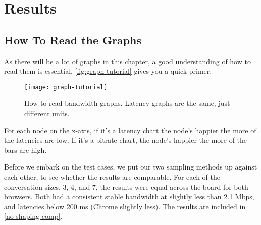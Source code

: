 \section{Results}

\subsection{How To Read the Graphs}

As there will be a lot of graphs in this chapter, a good understanding of how to read them is essential. \autoref{fig:graph-tutorial} gives you a quick primer.

\begin{figure}
    \centering
    \texttt{[image: graph-tutorial]}
    \caption{How to read bandwidth graphs. Latency graphs are the same, just different units.}
    \label{fig:graph-tutorial}
\end{figure}

For each node on the x-axis, if it's a latency chart the node's happier the more of the latencies are low. If it's a bitrate chart, the node's happier the more of the bars are high.

Before we embark on the test cases, we put our two sampling methods up against each other, to see whether the results are comparable. For each of the conversation sizes, 3, 4, and 7, the results were equal across the board for both browsers. Both had a consistent stable bandwidth at slightly less than 2.1 Mbps, and latencies below 200 ms (Chrome slightly less). The results are included in \autoref{no-shaping-comp}.








